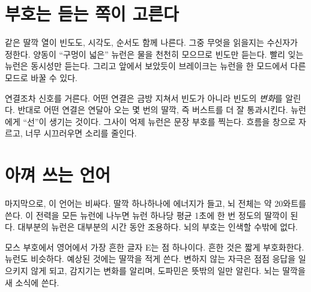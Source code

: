 \section*{부호는 듣는 쪽이 고른다}

같은 딸깍 열이 빈도도, 시각도, 순서도 함께 나른다. 그중 무엇을 읽을지는 수신자가 정한다. 양동이 “구멍이 넓은” 뉴런은 물을 천천히 모으므로 빈도만 듣는다. 빨리 잊는 뉴런은 동시성만 듣는다. 그리고 앞에서 보았듯이 브레이크는 뉴런을 한 모드에서 다른 모드로 바꿀 수 있다.

연결조차 신호를 거른다. 어떤 연결은 금방 지쳐서 빈도가 아니라 빈도의 \emph{변화}를 알린다. 반대로 어떤 연결은 연달아 오는 몇 번의 딸깍, 즉 버스트를 더 잘 통과시킨다. 뉴런에게 “선”이 생기는 것이다. 그사이 억제 뉴런은 문장 부호를 찍는다. 흐름을 창으로 자르고, 너무 시끄러우면 소리를 줄인다.

\section*{아껴 쓰는 언어}

마지막으로, 이 언어는 비싸다. 딸깍 하나하나에 에너지가 들고, 뇌 전체는 약 20와트를 쓴다. 이 전력을 모든 뉴런에 나누면 뉴런 하나당 평균 1초에 한 번 정도의 딸깍이 된다. 대부분의 뉴런은 대부분의 시간 동안 조용하다. 뇌의 부호는 인색할 수밖에 없다.

모스 부호에서 영어에서 가장 흔한 글자 E는 점 하나이다. 흔한 것은 짧게 부호화한다. 뉴런도 비슷하다. 예상된 것에는 딸깍을 적게 쓴다. 변하지 않는 자극은 점점 응답을 일으키지 않게 되고, 감지기는 변화를 알리며, 도파민은 뜻밖의 일만 알린다. 뇌는 딸깍을 새 소식에 쓴다.

